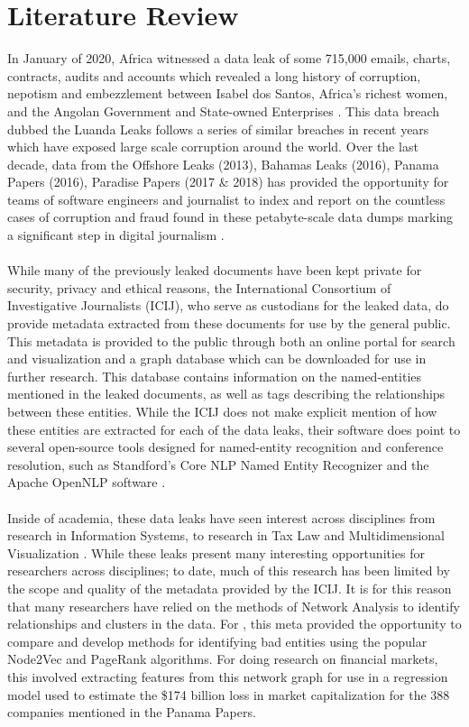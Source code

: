 \documentclass[a4paper,latin]{paper}
\begin{document}
\section{Literature Review}
In January of 2020, Africa witnessed a data leak of some 715,000 emails, charts, contracts, audits and accounts which revealed a long history of corruption, nepotism and embezzlement between Isabel dos Santos, Africa's richest women, and the Angolan Government and State-owned Enterprises \citep{Barr2020}.  This data breach dubbed the Luanda Leaks follows a series of similar breaches in recent years which have exposed large scale corruption around the world. Over the last decade, data from the Offshore Leaks (2013), Bahamas Leaks (2016), Panama Papers (2016), Paradise Papers (2017 & 2018) has provided the opportunity for teams of software engineers and journalist to index and report on the countless cases of corruption and fraud found in these petabyte-scale data dumps marking a significant step in digital journalism \citep{ICIJ2020}. 
\\
\\
While many of the previously leaked documents have been kept private for security, privacy and ethical reasons, the International Consortium of Investigative Journalists (ICIJ), who serve as custodians for the leaked data, do provide metadata extracted from these documents for use by the general public.  This metadata is provided to the public through both an online portal for search and visualization and a graph database which can be downloaded for use in further research.  This database contains information on the named-entities mentioned in the leaked documents, as well as tags describing the relationships between these entities.  While the ICIJ does not make explicit mention of how these entities are extracted for each of the data leaks, their software does point to several open-source tools designed for named-entity recognition and conference resolution, such as Standford's Core NLP Named Entity Recognizer and the Apache OpenNLP software \citep{InternationalConsortiumofInvestigativeJournalists, lafferty2001conditional}. 
\\
\\
Inside of academia, these data leaks have seen interest across disciplines from research in Information Systems, to research in Tax Law and Multidimensional Visualization \citep{Zhuhadar2019, Wiedemann2018}.  While these leaks present many interesting opportunities for researchers across disciplines; to date, much of this research has been limited by the scope and quality of the metadata provided by the ICIJ.  It is for this reason that many researchers have relied on the methods of Network Analysis to identify relationships and clusters in the data.  For \cite{Hajek2017}, this meta provided the opportunity to compare and develop methods for identifying bad entities using the popular Node2Vec and PageRank algorithms.  For \cite{ODonovan2019} doing research on financial markets, this involved extracting features from this network graph for use in a regression model used to estimate the \$174 billion loss in market capitalization for the 388 companies mentioned in the Panama Papers.  
\end{document}
